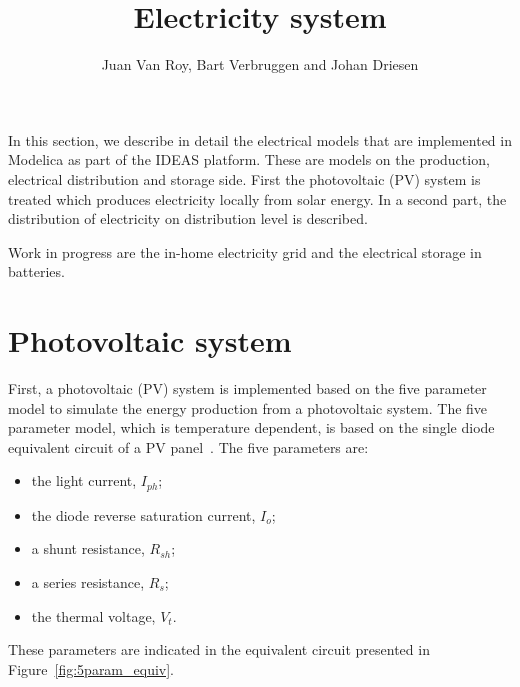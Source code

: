 
\title{Electricity system}
\author{Juan Van Roy, Bart Verbruggen and Johan Driesen}

\maketitle


\vspace{\baselineskip}

In this section, we describe in detail the electrical models that are implemented in Modelica as part of the IDEAS platform. These are models on the production, electrical distribution and storage side. First the photovoltaic (PV) system is treated which produces electricity locally from solar energy. In a second part, the distribution of electricity on distribution level is described.

Work in progress are the in-home electricity grid and the electrical storage in batteries.

\section{Photovoltaic system}
First, a photovoltaic (PV) system is implemented based on the five parameter model to simulate the energy production from a photovoltaic system. The five parameter model, which is temperature dependent, is based on the single diode equivalent circuit of a PV panel~\cite{desoto,sera}. The five parameters are:
\begin{itemize}
\item the light current, $I_{ph}$;
\item the diode reverse saturation current, $I_{o}$;
\item a shunt resistance, $R_{sh}$;
\item a series resistance, $R_{s}$;
\item the thermal voltage, $V_{t}$.
\end{itemize} 
These parameters are indicated in the equivalent circuit presented in Figure~\ref{fig:5param_equiv}.

